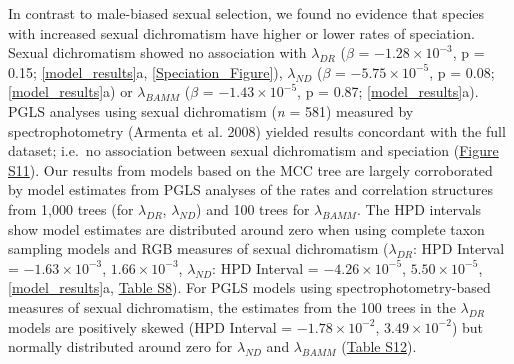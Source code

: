 \documentclass[]{article}
\begin{document}
In contrast to male-biased sexual selection, we found no evidence that
species with increased sexual dichromatism have higher or lower rates of
speciation. Sexual dichromatism showed no association with
\(\lambda_{DR}\) (\(\beta\) = \(-1.28 \times 10^{-3}\), p = 0.15;
\autoref{model_results}a, \autoref{Speciation_Figure}), \(\lambda_{ND}\)
(\(\beta\) = \(-5.75 \times 10^{-5}\), p = 0.08;
\autoref{model_results}a) or \(\lambda_{BAMM}\) (\(\beta\) =
\(-1.43 \times 10^{-5}\), p = 0.87; \autoref{model_results}a). PGLS
analyses using sexual dichromatism (\emph{n} = 581) measured by
spectrophotometry (Armenta et al. 2008) yielded results concordant with
the full dataset; i.e.~no association between sexual dichromatism and
speciation
(\href{https://justincally.github.io/SexualSelection_Speciation/#subsetted_analysis_with_spectrophotometry_data}{Figure S11}).
Our results from models based on the MCC tree are largely corroborated
by model estimates from PGLS analyses of the rates and correlation
structures from 1,000 trees (for \(\lambda_{DR}\), \(\lambda_{ND}\)) and
100 trees for \(\lambda_{BAMM}\). The HPD intervals show model estimates
are distributed around zero when using complete taxon sampling models
and RGB measures of sexual dichromatism (\(\lambda_{DR}\): HPD Interval
= \(-1.63 \times 10^{-3}\), \(1.66 \times 10^{-3}\), \(\lambda_{ND}\):
HPD Interval = \(-4.26 \times 10^{-5}\), \(5.50 \times 10^{-5}\),
\autoref{model_results}a,
\href{https://justincally.github.io/SexualSelection_Speciation/#pgls_model_summary}{Table S8}).
For PGLS models using spectrophotometry-based measures of sexual
dichromatism, the estimates from the 100 trees in the \(\lambda_{DR}\)
models are positively skewed (HPD Interval = \(-1.78 \times 10^{-2}\),
\(3.49 \times 10^{-2}\)) but normally distributed around zero for
\(\lambda_{ND}\) and \(\lambda_{BAMM}\)
(\href{https://justincally.github.io/SexualSelection_Speciation/#subsetted_analysis_with_spectrophotometry_data}{Table S12}).
\end{document}
